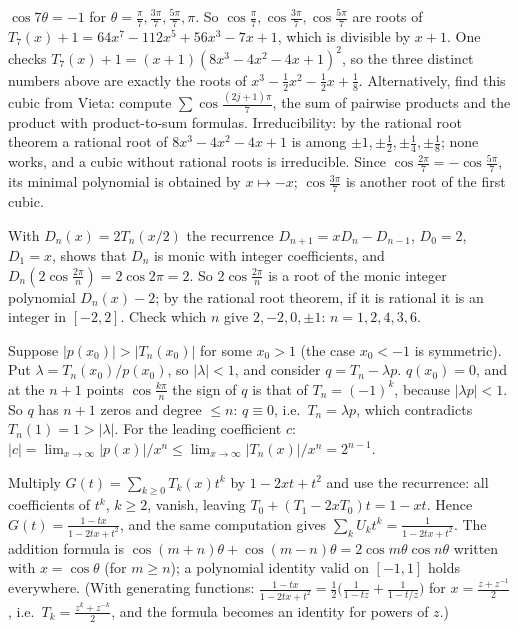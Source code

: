 \documentclass[11pt,a4paper]{article}
\begin{document}
 $\cos7\theta=-1$ for $\theta=\frac\pi7,\frac{3\pi}7,\frac{5\pi}7,\pi$. So $\cos\frac\pi7,\cos\frac{3\pi}7,\cos\frac{5\pi}7$ are roots of $T_7(x)+1=64x^7-112x^5+56x^3-7x+1$, which is divisible by $x+1$.
 One checks $T_7(x)+1=(x+1)(8x^3-4x^2-4x+1)^2$, so the three distinct numbers above are exactly the roots of $x^3-\frac12x^2-\frac12x+\frac18$. Alternatively, find this cubic from Vieta: compute $\sum\cos\frac{(2j+1)\pi}7$, the sum of pairwise products and the product with product-to-sum formulas.
 Irreducibility: by the rational root theorem a rational root of $8x^3-4x^2-4x+1$ is among $\pm1,\pm\frac12,\pm\frac14,\pm\frac18$; none works, and a cubic without rational roots is irreducible. Since $\cos\frac{2\pi}7=-\cos\frac{5\pi}7$, its minimal polynomial is obtained by $x\mapsto-x$; $\cos\frac{3\pi}7$ is another root of the first cubic.

 With $D_n(x)=2T_n(x/2)$ the recurrence $D_{n+1}=xD_n-D_{n-1}$, $D_0=2$, $D_1=x$, shows that $D_n$ is monic with integer coefficients, and $D_n(2\cos\frac{2\pi}n)=2\cos2\pi=2$.
 So $2\cos\frac{2\pi}n$ is a root of the monic integer polynomial $D_n(x)-2$; by the rational root theorem, if it is rational it is an integer in $[-2,2]$. Check which $n$ give $2,-2,0,\pm1$: $n=1,2,4,3,6$.

 Suppose $|p(x_0)|>|T_n(x_0)|$ for some $x_0>1$ (the case $x_0<-1$ is symmetric). Put $\lambda=T_n(x_0)/p(x_0)$, so $|\lambda|<1$, and consider $q=T_n-\lambda p$.
 $q(x_0)=0$, and at the $n+1$ points $\cos\frac{k\pi}n$ the sign of $q$ is that of $T_n=(-1)^k$, because $|\lambda p|<1$. So $q$ has $n+1$ zeros and degree $\le n$: $q\equiv0$, i.e.\ $T_n=\lambda p$, which contradicts $T_n(1)=1>|\lambda|$.
 For the leading coefficient $c$: $|c|=\lim_{x\to\infty}|p(x)|/x^n\le\lim_{x\to\infty}|T_n(x)|/x^n=2^{n-1}$.

 Multiply $G(t)=\sum_{k\ge0}T_k(x)t^k$ by $1-2xt+t^2$ and use the recurrence: all coefficients of $t^k$, $k\ge2$, vanish, leaving $T_0+(T_1-2xT_0)t=1-xt$. Hence $G(t)=\frac{1-tx}{1-2tx+t^2}$, and the same computation gives $\sum_kU_kt^k=\frac1{1-2tx+t^2}$.
 The addition formula is $\cos(m+n)\theta+\cos(m-n)\theta=2\cos m\theta\cos n\theta$ written with $x=\cos\theta$ (for $m\ge n$); a polynomial identity valid on $[-1,1]$ holds everywhere. (With generating functions: $\frac{1-tx}{1-2tx+t^2}=\frac12\bigl(\frac1{1-tz}+\frac1{1-t/z}\bigr)$ for $x=\frac{z+z^{-1}}2$, i.e.\ $T_k=\frac{z^k+z^{-k}}2$, and the formula becomes an identity for powers of $z$.)
\end{document}

